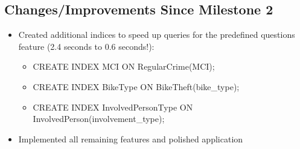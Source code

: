 \documentclass[12pt, a4paper]{article}
\begin{document}
\subsection*{Changes/Improvements Since Milestone 2}
\color{black}
\begin{itemize}
	\item Created additional indices to speed up queries for the predefined questions feature (2.4 seconds to 0.6 seconds!):
	\begin{itemize}
		\item CREATE INDEX MCI ON RegularCrime(MCI);
		\item CREATE INDEX BikeType ON BikeTheft(bike\_type);
		\item CREATE INDEX InvolvedPersonType ON InvolvedPerson(involvement\_type);
	\end{itemize}
	\item Implemented all remaining features and polished application
\end{itemize}
\end{document}
